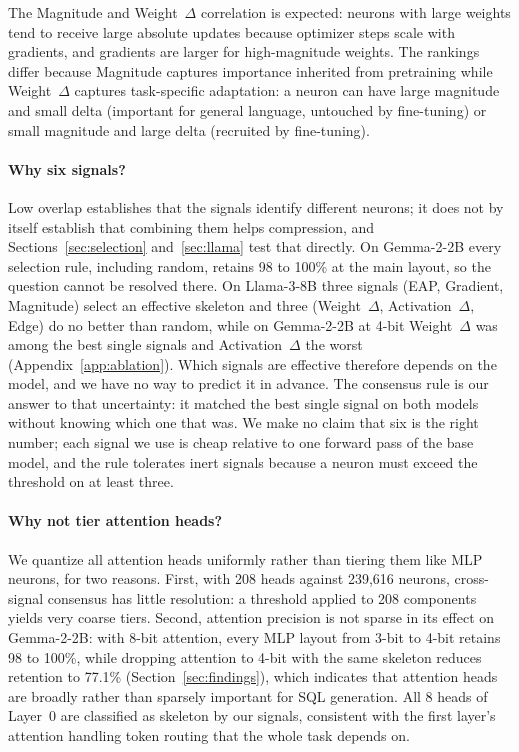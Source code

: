 \documentclass[11pt]{article}
\begin{document}
The Magnitude and Weight~$\Delta$ correlation is expected: 
neurons with large weights tend to receive large absolute 
updates because optimizer steps scale with gradients, and 
gradients are larger for high-magnitude weights. The rankings 
differ because Magnitude captures importance inherited from 
pretraining while Weight~$\Delta$ captures task-specific 
adaptation: a neuron can have large magnitude and small delta 
(important for general language, untouched by fine-tuning) or 
small magnitude and large delta (recruited by fine-tuning).

\paragraph{Why six signals?}
Low overlap establishes that the signals identify different 
neurons; it does not by itself establish that combining them 
helps compression, and Sections~\ref{sec:selection} 
and~\ref{sec:llama} test that directly. On Gemma-2-2B every 
selection rule, including random, retains 98 to 100\% at the 
main layout, so the question cannot be resolved there. On 
Llama-3-8B three signals (EAP, Gradient, Magnitude) select an 
effective skeleton and three (Weight~$\Delta$, 
Activation~$\Delta$, Edge) do no better than random, while on 
Gemma-2-2B at 4-bit Weight~$\Delta$ was among the best single 
signals and Activation~$\Delta$ the worst 
(Appendix~\ref{app:ablation}). Which signals are effective 
therefore depends on the model, and we have no way to predict 
it in advance. The consensus rule is our answer to that 
uncertainty: it matched the best single signal on both models 
without knowing which one that was. We make no claim that six 
is the right number; each signal we use is cheap relative to 
one forward pass of the base model, and the rule tolerates 
inert signals because a neuron must exceed the threshold on at 
least three.

\paragraph{Why not tier attention heads?}
We quantize all attention heads uniformly rather than tiering 
them like MLP neurons, for two reasons. First, with 208 heads 
against 239,616 neurons, cross-signal consensus has little 
resolution: a threshold applied to 208 components yields very 
coarse tiers. Second, attention precision is not sparse in its 
effect on Gemma-2-2B: with 8-bit attention, every MLP layout 
from 3-bit to 4-bit retains 98 to 100\%, while dropping 
attention to 4-bit with the same skeleton reduces retention to 
77.1\% (Section~\ref{sec:findings}), which indicates that 
attention heads are broadly rather than sparsely important for 
SQL generation. All 8 heads of Layer~0 are classified as 
skeleton by our signals, consistent with the first layer's 
attention handling token routing that the whole task depends on.
\end{document}
